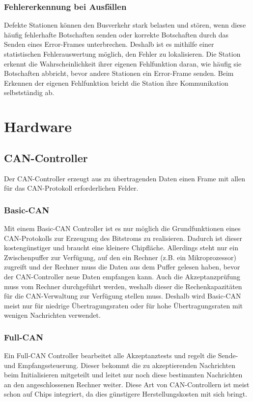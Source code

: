         \subsubsection{Fehlererkennung bei Ausfällen}
        Defekte Stationen können den Busverkehr stark belasten und stören, wenn diese häufig fehlerhafte Botschaften senden oder korrekte Botschaften durch das Senden eines Error-Frames unterbrechen.
        Deshalb ist es mithilfe einer statistischen Fehlerauswertung möglich, den Fehler zu lokalisieren.
        Die Station erkennt die Wahrscheinlichkeit ihrer eigenen Fehlfunktion daran, wie häufig sie Botschaften abbricht, bevor andere Stationen ein Error-Frame senden.
        Beim Erkennen der eigenen Fehlfunktion bricht die Station ihre Kommunikation selbstständig ab. 

\section{Hardware}
    \subsection{CAN-Controller}
    Der CAN-Controller erzeugt aus zu übertragenden Daten einen Frame mit allen für das CAN-Protokoll erforderlichen Felder. 

        \subsubsection{Basic-CAN}
        Mit einem Basic-CAN Controller ist es nur möglich die Grundfunktionen eines CAN-Protokolls zur Erzeugung des Bitstroms zu realisieren.
        Dadurch ist dieser kostengünstiger und braucht eine kleinere Chipfläche.
        Allerdings steht nur ein Zwischenpuffer zur Verfügung, auf den ein Rechner (z.B. ein Mikroprozessor) zugreift und der Rechner muss die Daten aus dem Puffer gelesen haben, bevor der CAN-Controller neue Daten empfangen kann.
        Auch die Akzeptanzprüfung muss vom Rechner durchgeführt werden, weshalb dieser die Rechenkapazitäten für die CAN-Verwaltung zur Verfügung stellen muss.
        Deshalb wird Basic-CAN meist nur für niedrige Übertragungsraten oder für hohe Übertragungsraten mit wenigen Nachrichten verwendet.  

        \subsubsection{Full-CAN}
        Ein Full-CAN Controller bearbeitet alle Akzeptanztests und regelt die Sende- und Empfangssteuerung.
        Dieser bekommt die zu akzeptierenden Nachrichten beim Initialisieren mitgeteilt und leitet nur noch diese bestimmten Nachrichten an den angeschlossenen Rechner weiter.
        Diese Art von CAN-Controllern ist meist schon auf Chips integriert, da dies günstigere Herstellungskosten mit sich bringt. 
        

